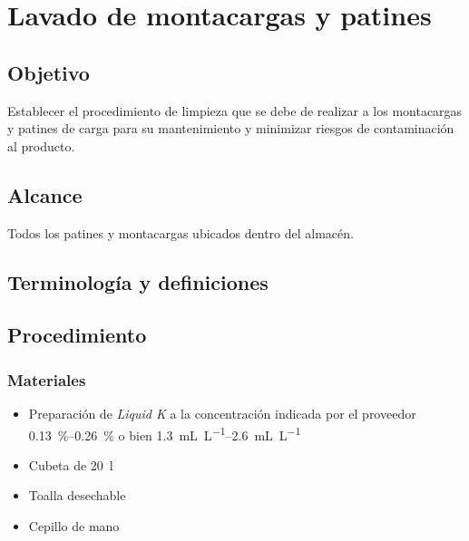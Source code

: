 \thispagestyle{formato-PI}
\renewcommand{\MayorVer}{2}
\renewcommand{\MenorVer}{0}
\renewcommand{\Titulo}{Lavado de montacargas y patines}
\renewcommand{\Codigo}{HYS-5-IT}
\renewcommand{\FechaPub}{2023--01}

\section{\Titulo}

\subsection{Objetivo}
Establecer el procedimiento de limpieza que se debe de realizar a los montacargas y patines de carga para su mantenimiento y minimizar riesgos de contaminación al producto.

\subsection{Alcance}
Todos los patines y montacargas ubicados dentro del almacén.

\subsection{Terminología y definiciones}
\begin{description}
\end{description}

\subsection{Procedimiento}

\subsubsection{Materiales}

\begin{itemize}
	\item Preparación de \textit{Liquid K} a la concentración indicada por el proveedor \qtyrange{0.13}{0.26}{\percent} o bien \qtyrange{1.3}{2.6}{\milli\liter\per\liter}
	\item Cubeta de \qty{20}{\litre}
	\item Toalla desechable
	\item Cepillo de mano
\end{itemize}

